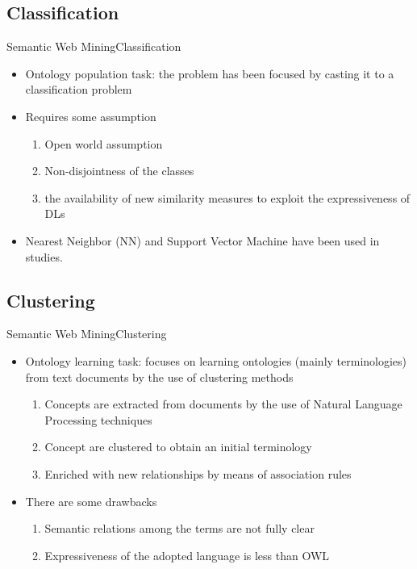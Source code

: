 \documentclass[10pt]{beamer}
\begin{document}
\subsection{Classification}
\begin{frame}{Semantic Web Mining}{Classification}
	\begin{itemize}
		\item Ontology population task: the problem has been focused by casting it to a classification problem \cite{d2010inductive}
	 	\item Requires some assumption
	 		\begin{enumerate}
				\item Open world assumption
				\item Non-disjointness of the classes
				\item the availability of new similarity measures to exploit the expressiveness of DLs 
	 		\end{enumerate}
 		\item Nearest Neighbor (NN) and Support Vector Machine have been used in studies.
	\end{itemize}
\end{frame}
\subsection{Clustering}
\begin{frame}{Semantic Web Mining}{Clustering}
	\begin{itemize}
	\item Ontology learning task: focuses on learning ontologies (mainly terminologies) from text documents by the use of clustering methods \cite{d2010inductive}
		\begin{enumerate}
			\item Concepts are extracted from documents by the use of Natural Language Processing techniques   
			\item Concept are clustered to obtain an initial terminology 
			\item Enriched with new relationships  by means of association rules
		\end{enumerate}
	\item There are some drawbacks 
		\begin{enumerate}
			\item Semantic relations among the terms are not fully clear 
			\item Expressiveness of the adopted language is less than OWL
		\end{enumerate}
	\end{itemize}
\end{frame}
\end{document}
